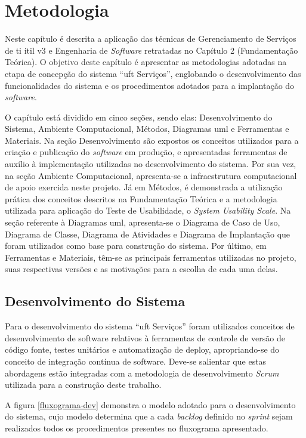 \chapter{Metodologia}

\noindent Neste capítulo é descrita a aplicação das técnicas de Gerenciamento de Serviços de \acrshort{ti} \acrshort{itil} v3 e Engenharia de \textit{Software} retratadas no Capítulo 2 (Fundamentação Teórica). O objetivo deste capítulo é apresentar as metodologias adotadas na etapa de concepção do sistema ``\acrshort{uft} Serviços'', englobando o desenvolvimento das funcionalidades do sistema e os procedimentos adotados para a implantação do \textit{software}.

O capítulo está dividido em cinco seções, sendo elas: Desenvolvimento do Sistema, Ambiente Computacional, Métodos, Diagramas \gls{uml} e Ferramentas e Materiais. Na seção Desenvolvimento são expostos os conceitos utilizados para a criação e publicação do \textit{software} em produção, e apresentadas ferramentas de auxílio à implementação utilizadas no desenvolvimento do sistema. Por sua vez, na seção Ambiente Computacional, apresenta-se  a infraestrutura computacional de apoio exercida neste projeto. Já em Métodos, é demonstrada a utilização prática dos conceitos descritos na Fundamentação Teórica e a metodologia utilizada para aplicação do Teste de Usabilidade, o \textit{System Usability Scale}. Na seção referente à Diagramas  \acrshort{uml}, apresenta-se o Diagrama de Caso de Uso, Diagrama de Classe, Diagrama de Atividades e Diagrama de Implantação que foram utilizados como base para construção do sistema. Por último, em Ferramentas e Materiais, têm-se as principais ferramentas utilizadas no projeto, suas respectivas versões e as motivações para a escolha de cada uma delas.

\section{Desenvolvimento do Sistema}

\noindent Para o desenvolvimento do sistema ``\acrshort{uft} Serviços'' foram utilizados conceitos de desenvolvimento de software relativos à ferramentas de controle de versão de código fonte, testes unitários e automatização de deploy, apropriando-se do conceito de integração contínua de software. Deve-se salientar que estas abordagens estão integradas com a metodologia de desenvolvimento \textit{Scrum} utilizada para a construção deste trabalho.

A figura \ref{fluxograma-dev} demonstra o modelo adotado para o desenvolvimento do sistema, cujo modelo determina que a cada \textit{backlog} definido no \textit{sprint} sejam realizados todos os procedimentos presentes no fluxograma apresentado. 

